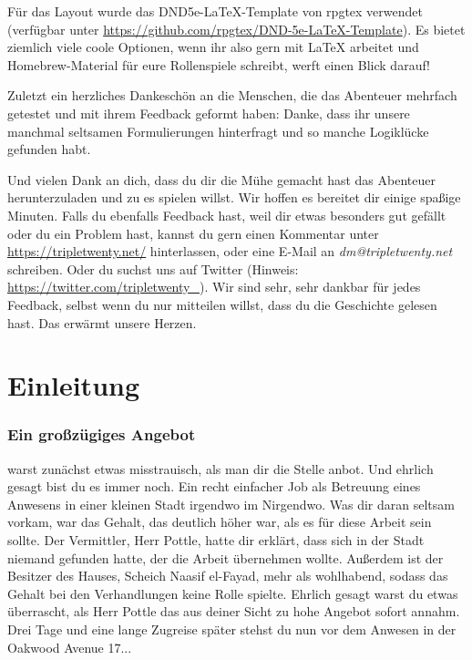 Für das Layout wurde das DND5e-LaTeX-Template von rpgtex verwendet (verfügbar unter \url{https://github.com/rpgtex/DND-5e-LaTeX-Template}).
Es bietet ziemlich viele coole Optionen, wenn ihr also gern mit LaTeX arbeitet und Homebrew-Material für eure Rollenspiele schreibt, werft einen Blick darauf!

Zuletzt ein herzliches Dankeschön an die Menschen, die das Abenteuer mehrfach getestet und mit ihrem Feedback geformt haben: %
Danke, dass ihr unsere manchmal seltsamen Formulierungen hinterfragt und so manche Logiklücke gefunden habt.

Und vielen Dank an dich, dass du dir die Mühe gemacht hast das Abenteuer herunterzuladen und zu es spielen willst.
Wir hoffen es bereitet dir einige spaßige Minuten.
Falls du ebenfalls Feedback hast, weil dir etwas besonders gut gefällt oder du ein Problem hast, kannst du gern einen Kommentar unter \url{https://tripletwenty.net/} hinterlassen,
oder eine E-Mail an \textit{dm@tripletwenty.net} schreiben.
Oder du suchst uns auf Twitter (Hinweis: \url{https://twitter.com/tripletwenty_}).
Wir sind sehr, sehr dankbar für jedes Feedback, selbst wenn du nur mitteilen willst, dass du die Geschichte gelesen hast.
Das erwärmt unsere Herzen.


\chapter*{Einleitung}

\subsection{Ein großzügiges Angebot}

 warst zunächst etwas misstrauisch, als man dir die Stelle anbot.
Und ehrlich gesagt bist du es immer noch.
Ein recht einfacher Job als Betreuung eines Anwesens in einer kleinen Stadt irgendwo im Nirgendwo.
Was dir daran seltsam vorkam, war das Gehalt, das deutlich höher war, als es für diese Arbeit sein sollte.
Der Vermittler, Herr Pottle, hatte dir erklärt, dass sich in der Stadt niemand gefunden hatte, der die Arbeit übernehmen wollte.
Außerdem ist der Besitzer des Hauses, Scheich Naasif el-Fayad, mehr als wohlhabend, sodass das Gehalt bei den Verhandlungen keine Rolle spielte.
Ehrlich gesagt warst du etwas überrascht, als Herr Pottle das aus deiner Sicht zu hohe Angebot sofort annahm.
Drei Tage und eine lange Zugreise später stehst du nun vor dem Anwesen in der Oakwood Avenue 17...

